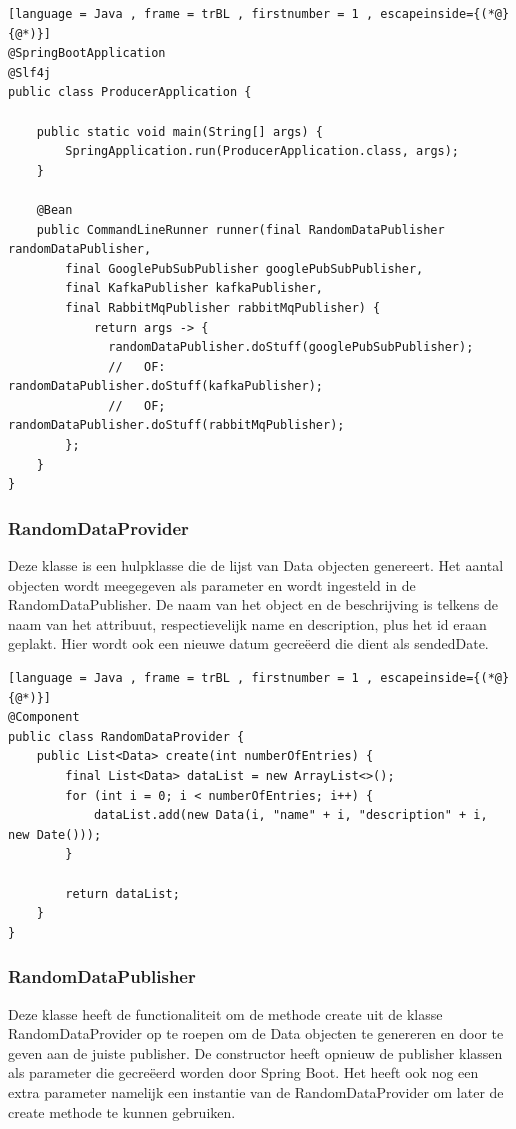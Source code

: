 \begin{lstlisting}[language = Java , frame = trBL , firstnumber = 1 , escapeinside={(*@}{@*)}]
@SpringBootApplication
@Slf4j
public class ProducerApplication {
    
    public static void main(String[] args) {
        SpringApplication.run(ProducerApplication.class, args);
    }
    
    @Bean
    public CommandLineRunner runner(final RandomDataPublisher randomDataPublisher,
        final GooglePubSubPublisher googlePubSubPublisher,
        final KafkaPublisher kafkaPublisher,
        final RabbitMqPublisher rabbitMqPublisher) {
            return args -> {
              randomDataPublisher.doStuff(googlePubSubPublisher);
              //   OF:         randomDataPublisher.doStuff(kafkaPublisher);
              //   OF;         randomDataPublisher.doStuff(rabbitMqPublisher);
        };
    }
}
     \end{lstlisting}
\subsubsection{RandomDataProvider}
Deze klasse is een hulpklasse die de lijst van Data objecten genereert. Het aantal objecten wordt meegegeven als parameter en wordt ingesteld in de RandomDataPublisher. De naam van het object en de beschrijving is telkens de naam van het attribuut, respectievelijk name en description, plus het id eraan geplakt. Hier wordt ook een nieuwe datum gecreëerd die dient als sendedDate.
\begin{lstlisting}[language = Java , frame = trBL , firstnumber = 1 , escapeinside={(*@}{@*)}]
@Component
public class RandomDataProvider {
    public List<Data> create(int numberOfEntries) {
        final List<Data> dataList = new ArrayList<>();
        for (int i = 0; i < numberOfEntries; i++) {
            dataList.add(new Data(i, "name" + i, "description" + i, new Date()));
        }
        
        return dataList;
    }
}
           \end{lstlisting}

\subsubsection{RandomDataPublisher}
Deze klasse heeft de functionaliteit om de methode create uit de klasse RandomDataProvider op te roepen om de Data objecten te genereren en door te geven aan de juiste publisher. De constructor heeft opnieuw de publisher klassen als parameter die gecreëerd worden door Spring Boot. Het heeft ook nog een extra parameter namelijk een instantie van de RandomDataProvider om later de create methode te kunnen gebruiken.

